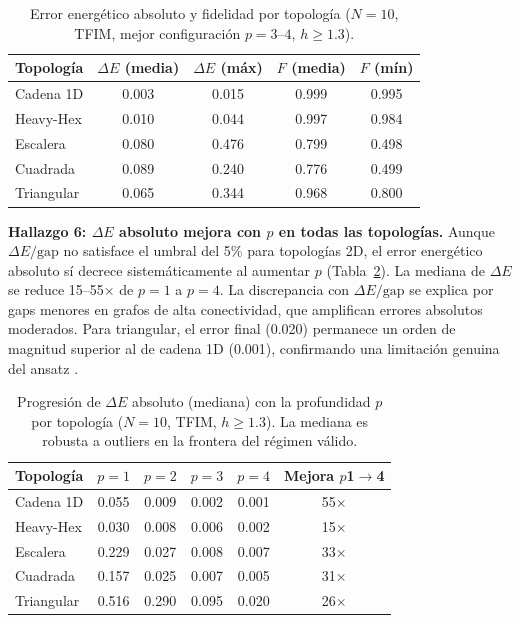 \documentclass[11pt,a4paper,spanish]{book}
\begin{document}
\begin{table}[h]
\centering
\caption{Error energético absoluto y fidelidad por topología ($N = 10$, TFIM, mejor configuración $p=3$--$4$, $h \geq 1.3$).}
\label{tab:cross_topo_de}
\begin{tabular}{lcccc}
\toprule
\textbf{Topología} & \textbf{$\Delta E$ (media)} & \textbf{$\Delta E$ (máx)} & \textbf{$F$ (media)} & \textbf{$F$ (mín)} \\
\midrule
Cadena 1D & 0.003 & 0.015 & 0.999 & 0.995 \\
Heavy-Hex & 0.010 & 0.044 & 0.997 & 0.984 \\
Escalera & 0.080 & 0.476 & 0.799 & 0.498 \\
Cuadrada & 0.089 & 0.240 & 0.776 & 0.499 \\
Triangular & 0.065 & 0.344 & 0.968 & 0.800 \\
\bottomrule
\end{tabular}
\end{table}

\textbf{Hallazgo 6: $\Delta E$ absoluto mejora con $p$ en todas las topologías.} Aunque $\Delta E/\text{gap}$ no satisface el umbral del 5\% para topologías 2D, el error energético absoluto sí decrece sistemáticamente al aumentar $p$ (Tabla~\ref{tab:delta_e_vs_p}). La mediana de $\Delta E$ se reduce 15--55$\times$ de $p=1$ a $p=4$. La discrepancia con $\Delta E/\text{gap}$ se explica por gaps menores en grafos de alta conectividad, que amplifican errores absolutos moderados. Para triangular, el error final (0.020) permanece un orden de magnitud superior al de cadena 1D (0.001), confirmando una limitación genuina del ansatz \citep{tripathi2026}.

\begin{table}[h]
\centering
\caption{Progresión de $\Delta E$ absoluto (mediana) con la profundidad $p$ por topología ($N = 10$, TFIM, $h \geq 1.3$). La mediana es robusta a outliers en la frontera del régimen válido.}
\label{tab:delta_e_vs_p}
\begin{tabular}{lccccc}
\toprule
\textbf{Topología} & \textbf{$p = 1$} & \textbf{$p = 2$} & \textbf{$p = 3$} & \textbf{$p = 4$} & \textbf{Mejora $p$1$\to$4} \\
\midrule
Cadena 1D   & 0.055 & 0.009 & 0.002 & 0.001 & 55$\times$ \\
Heavy-Hex   & 0.030 & 0.008 & 0.006 & 0.002 & 15$\times$ \\
Escalera    & 0.229 & 0.027 & 0.008 & 0.007 & 33$\times$ \\
Cuadrada    & 0.157 & 0.025 & 0.007 & 0.005 & 31$\times$ \\
Triangular  & 0.516 & 0.290 & 0.095 & 0.020 &  26$\times$ \\
\bottomrule
\end{tabular}
\end{table}
\end{document}

